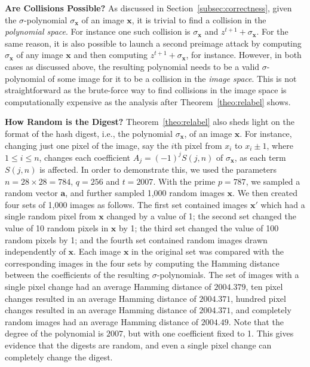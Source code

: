 \documentclass[pdflatex,sn-mathphys-num]{sn-jnl}
\newcommand{\descr}[1]{\vspace{0.2cm} \noindent \textbf{#1}}
\theoremstyle{definition}
\newcommand{\vtr}[1]{\mathbf{#1}}
\begin{document}
\descr{Are Collisions Possible?} As discussed in Section~\ref{subsec:correctness}, given the $\sigma$-polynomial $\sigma_{\vtr{x}}$ of an image $\vtr{x}$, it is trivial to find a collision in the \emph{polynomial space}. For instance one such collision is $\sigma_\vtr{x}$ and $z^{t+1} + \sigma_\vtr{x}$. For the same reason, it is also possible to launch a second preimage attack by computing $\sigma_\vtr{x}$ of any image $\vtr{x}$ and then computing $z^{t+1} + \sigma_\vtr{x}$, for instance. However, in both cases as discussed above, the resulting polynomial needs to be a valid $\sigma$-polynomial of some image for it to be a collision in the \emph{image space}. This is not straightforward as the brute-force way to find collisions in the image space is computationally expensive as the analysis after Theorem~\ref{theo:relabel} shows. 
  

\descr{How Random is the Digest?} Theorem~\ref{theo:relabel} also sheds light on the format of the hash digest, i.e., the polynomial $\sigma_\vtr{x}$, of an image $\vtr{x}$. For instance, changing just one pixel of the image, say the $i$th pixel from $x_i$ to $x_i \pm 1$, where $1 \leq i \leq n$, changes each coefficient $A_j = (-1)^j S(j, n)$ of $\sigma_\vtr{x}$, as each term $S(j, n)$ is affected. In order to demonstrate this, we used the parameters $n = 28 \times 28 = 784$, $q = 256$ and $t = 2007$. With the prime $p = 787$, we sampled a random vector $\vtr{a}$, and further sampled 1,000 random images $\vtr{x}$. We then created four sets of 1,000 images as follows. The first set contained images $\vtr{x}'$ which had a single random pixel from $\vtr{x}$ changed by a value of 1; the second set changed the value of 10 random pixels in $\vtr{x}$ by 1; the third set changed the value of 100 random pixels by 1; and the fourth set contained random images drawn independently of $\vtr{x}$. Each image $\vtr{x}$ in the original set was compared with the corresponding images in the four sets by computing the Hamming distance between the coefficients of the resulting $\sigma$-polynomials. The set of images with a single pixel change had an average Hamming distance of $2004.379$, ten pixel changes resulted in an average Hamming distance of $2004.371$, hundred pixel changes resulted in an average Hamming distance of $2004.371$, and completely random images had an average Hamming distance of $2004.49$. Note that the degree of the polynomial is $2007$, but with one coefficient fixed to 1. This gives evidence that the digests are random, and even a single pixel change can completely change the digest. 
\end{document}
